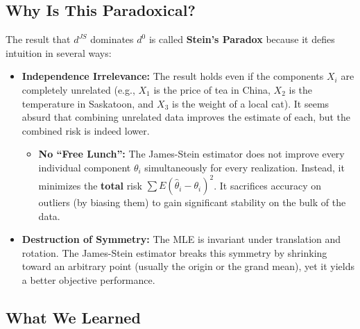 \documentclass[
  letterpaper,
  DIV=11,
  numbers=noendperiod]{scrreprt}
\providecommand{\tightlist}{%
  \setlength{\itemsep}{0pt}\setlength{\parskip}{0pt}}
\renewcommand{\[}{\begin{equation}}
\renewcommand{\]}{\end{equation}}
\theoremstyle{definition}
\theoremstyle{plain}
\theoremstyle{plain}
\theoremstyle{plain}
\theoremstyle{definition}
\theoremstyle{plain}
\theoremstyle{remark}
\begin{document}
\subsection{Why Is This Paradoxical?}\label{why-is-this-paradoxical}

The result that \(d^{JS}\) dominates \(d^0\) is called \textbf{Stein's
Paradox} because it defies intuition in several ways:

\begin{itemize}
\tightlist
\item
  \textbf{Independence Irrelevance:} The result holds even if the
  components \(X_i\) are completely unrelated (e.g., \(X_1\) is the
  price of tea in China, \(X_2\) is the temperature in Saskatoon, and
  \(X_3\) is the weight of a local cat). It seems absurd that combining
  unrelated data improves the estimate of each, but the combined risk is
  indeed lower.

  \begin{itemize}
  \tightlist
  \item
    \textbf{No ``Free Lunch'':} The James-Stein estimator does not
    improve every individual component \(\theta_i\) simultaneously for
    every realization. Instead, it minimizes the \textbf{total} risk
    \(\sum E(\hat{\theta}_i - \theta_i)^2\). It sacrifices accuracy on
    outliers (by biasing them) to gain significant stability on the bulk
    of the data.
  \end{itemize}
\item
  \textbf{Destruction of Symmetry:} The MLE is invariant under
  translation and rotation. The James-Stein estimator breaks this
  symmetry by shrinking toward an arbitrary point (usually the origin or
  the grand mean), yet it yields a better objective performance.
\end{itemize}

\subsection{What We Learned}\label{what-we-learned}
\end{document}
